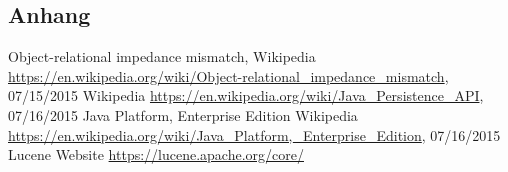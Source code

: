 \subsection*{Anhang}\label{anhang}

%
%
\begin{thebibliography}{99}
	Object-relational impedance mismatch,
	Wikipedia
	\url{https://en.wikipedia.org/wiki/Object-relational_impedance_mismatch}, 07/15/2015
	Wikipedia
	\url{https://en.wikipedia.org/wiki/Java_Persistence_API}, 07/16/2015
	Java Platform, Enterprise Edition
	Wikipedia
	\url{https://en.wikipedia.org/wiki/Java_Platform,_Enterprise_Edition}, 07/16/2015
	Lucene Website
	\url{https://lucene.apache.org/core/}
	
	
\end{thebibliography}
